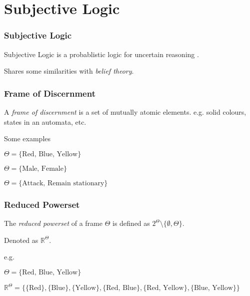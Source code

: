 \documentclass{beamer}
\begin{document}
%
%

\section{Subjective Logic}

\begin{frame}
\frametitle{Subjective Logic}

Subjective Logic is a probablistic logic for uncertain reasoning
\cite{josang_logic_2001}.

Shares some similarities with \emph{belief theory}.

\end{frame}


\begin{frame}
\frametitle{Frame of Discernment}

A \emph{frame of discernment} is a set of mutually atomic elements. e.g.
solid colours, states in an automata, etc.

Some examples

$\Theta = \lbrace \mbox{Red, Blue, Yellow} \rbrace$

$\Theta = \lbrace \mbox{Male, Female} \rbrace$

$\Theta = \lbrace \mbox{Attack, Remain stationary} \rbrace$

\end{frame}


\begin{frame}
\frametitle{Reduced Powerset}

The \emph{reduced powerset} of a frame $\Theta$ is defined as $2^{\Theta} \setminus \lbrace \emptyset, \Theta \rbrace$.

Denoted as $\mathbb{R}^\Theta$.

e.g.

$\Theta = \lbrace \mbox{Red, Blue, Yellow} \rbrace$

$\mathbb{R}^\Theta = \lbrace
  \lbrace \mbox{Red} \rbrace,
  \lbrace \mbox{Blue} \rbrace,
  \lbrace \mbox{Yellow} \rbrace,
  \lbrace \mbox{Red, Blue} \rbrace,
  \lbrace \mbox{Red, Yellow} \rbrace,
  \lbrace \mbox{Blue, Yellow} \rbrace
  \rbrace$

\end{frame}
\end{document}
